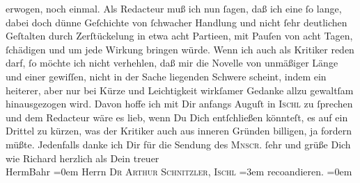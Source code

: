 \begin{ledgroupsized}[t]{13cm}
               erwogen, noch einmal. Als Redacteur muß ich nun ſagen, daß ich eine ſo lange, dabei
               doch dünne Geſchichte von ſchwacher Handlung und nicht ſehr deutlichen Geſtalten
               durch Zerſtückelung in etwa acht Partieen, mit Pauſen von acht Tagen, ſchädigen und
               um jede Wirkung bringen würde. Wenn ich auch als Kritiker reden darf, ſo möchte ich
               nicht verhehlen, daß mir die Novelle von unmäßiger Länge und {\pb}einer gewiſſen, nicht in der Sache liegenden
               Schwere scheint, indem ein heiterer, aber nur bei Kürze und Leichtigkeit wirkſamer
               Gedanke allzu gewaltſam hinausgezogen wird. Davon hoffe ich mit Dir anfangs Auguſt in
                  \textsc{Ischl} zu ſprechen und dem Redacteur wäre es lieb, wenn Du Dich entſchließen könnteſt,
               es auf ein Drittel zu kürzen, was der Kritiker auch aus inneren Gründen billigen, ja
               fordern müßte. Jedenfalls danke ich Dir für die Sendung des \textsc{Mnscr}. ſehr und grüße Dich wie Richard herzlich\pend
           \pstart
           als Dein treuer{\\[\baselineskip]}\spacefill\mbox{HermBahr}\pend
           \leftskip=0em{}\pstart
           \noindent{}Herrn \textsc{Dr Arthur Schnitzler, Ischl}\pend
           \leftskip=3em{}\pstart
           \noindent{}reco{\geminationm}andieren.\pend
           \leftskip=0em{}\pstart
           \textcolor{gray}{\textbf{\label{T_L00465_1v}\label{T_L00465_1h}}}\pend
           \endnumbering{}\end{ledgroupsized}  \newcommand{\dateiname}{L00465}\newcommand{\titel}{Hermann Bahr an Arthur Schnitzler, 23. 7. 1895}\newcommand{\editorInnen}{ Kurt Ifkovits,  Martin Anton Müller}
      